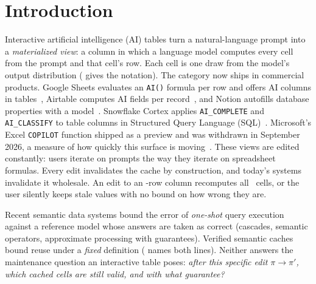 \keepheading
\section{Introduction}
\label{sec:intro}

Interactive artificial intelligence (AI) tables turn a natural-language
prompt into a \emph{materialized view}: a column in which a language
model computes every cell from the prompt and that cell's row. Each
cell is one draw from the model's output distribution
( gives the notation). The
category now ships in commercial products.
Google Sheets evaluates an \texttt{AI()} formula per row and offers AI
columns in tables~\cite{sheetsai}, Airtable computes AI fields per
record~\cite{airtableai}, and Notion autofills database properties with
a model~\cite{notionautofill}. Snowflake Cortex applies
\texttt{AI\_COMPLETE} and \texttt{AI\_CLASSIFY} to table columns in
Structured Query Language (SQL)~\cite{snowflakecortex}. Microsoft's
Excel \texttt{COPILOT} function
shipped as a preview and was withdrawn in September 2026, a measure of
how quickly this surface is moving~\cite{excelcopilot}. These views are
edited constantly: users iterate on prompts the way they iterate on
spreadsheet formulas. Every edit invalidates the cache by construction,
and today's systems invalidate it wholesale. An edit to an
\corpusSO-row column recomputes all \corpusSO\ cells, or the user
silently keeps stale values with no bound on how wrong they are.

Recent semantic data systems bound the error of \emph{one-shot} query
execution against a reference model whose answers are taken as correct
(cascades, semantic operators, approximate processing with guarantees).
Verified semantic caches bound reuse under a \emph{fixed} definition
( names both lines). Neither answers the maintenance
question an interactive table poses: \emph{after this specific
edit $\pi \to \pi'$, which cached cells are still valid, and with what
guarantee?}

